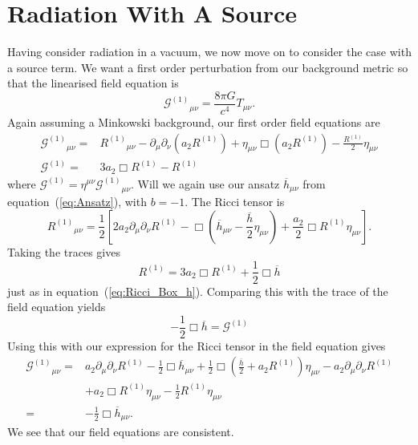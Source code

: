 \documentclass[a4paper, 11pt, titlepage, twoside]{report}
\newcommand{\eqnref}[1]{equation~(\ref{eq:#1})}
\newcommand{\recip}[1]{\ensuremath{\frac{1}{#1}}}
\begin{document}
{\section{Radiation With A Source}

Having consider radiation in a vacuum, we now move on to consider the case with a source term. We want a first order perturbation from our background metric so that the linearised field equation is
\begin{equation}
{\mathcal{G}^{(1)}}_{\mu\nu} = \frac{8\pi G}{c^4}T_{\mu\nu}.
\end{equation}
Again assuming a Minkowski background, our first order field equations are
\begin{align}
{\mathcal{G}^{(1)}}_{\mu\nu} = {} & {R^{(1)}}_{\mu\nu} - \partial_\mu\partial_\nu(a_2 R^{(1)}) + \eta_{\mu\nu}\Box(a_2 R^{(1)}) - \frac{R^{(1)}}{2}\eta_{\mu\nu} \\
\mathcal{G}^{(1)} = {} & 3a_2 \Box R^{(1)} - R^{(1)}
\end{align}
where $\mathcal{G}^{(1)} = \eta^{\mu\nu}{\mathcal{G}^{(1)}}_{\mu\nu}$. Will we again use our ansatz $\overline{h}_{\mu\nu}$ from \eqnref{Ansatz}, with $b = -1$. The Ricci tensor is
\begin{equation}
{R^{(1)}}_{\mu\nu} = \frac{1}{2}\left[2 a_2 \partial_\mu\partial_\nu R^{(1)} - \Box\left(\overline{h}_{\mu\nu} -\frac{\overline{h}}{2}\eta_{\mu\nu}\right) + \frac{a_2}{2}\Box R^{(1)}\eta_{\mu\nu}\right].
\end{equation}
Taking the traces gives
\begin{equation}
R^{(1)} = 3a_2\Box R^{(1)} + \recip{2}\Box\overline{h}
\end{equation}
just as in \eqnref{Ricci_Box_h}. Comparing this with the trace of the field equation yields
\begin{equation}
-\recip{2}\Box\overline{h} = \mathcal{G}^{(1)}
\end{equation}
Using this with our expression for the Ricci tensor in the field equation gives
\begin{align}
{\mathcal{G}^{(1)}}_{\mu\nu} = {} & a_2\partial_\mu\partial_\nu R^{(1)} - \recip{2}\Box\overline{h}_{\mu\nu} + \recip{2}\Box\left(\frac{\overline{h}}{2} + a_2 R^{(1)}\right)\eta_{\mu\nu} - a_2\partial_\mu\partial_\nu R^{(1)} \nonumber \\
 & + {} a_2\Box R^{(1)} \eta_{\mu\nu} - \recip{2}R^{(1)}\eta_{\mu\nu} \nonumber \\
 = {} & - \recip{2}\Box\overline{h}_{\mu\nu}.
\end{align}
We see that our field equations are consistent.

}
\end{document}
